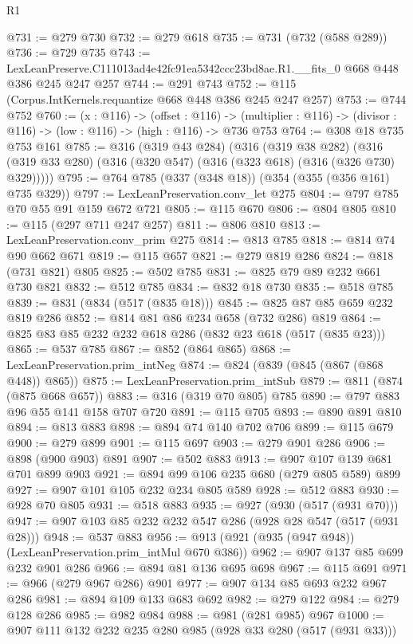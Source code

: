 \begin{lexlean}{R1}
\begin{coremodule}
@731 := @279 @730
@732 := @279 @618
@735 := @731 (@732 (@588 @289))
@736 := @729 @735
@743 := LexLeanPreserve.C111013ad4e42fc91ea5342ccc23bd8ae.R1.__fits_0 @668 @448 @386 @245 @247 @257
@744 := @291 @743
@752 := @115 (Corpus.IntKernels.requantize @668 @448 @386 @245 @247 @257)
@753 := @744 @752
@760 := (x : @116) ->
  (offset : @116) ->
  (multiplier : @116) -> (divisor : @116) -> (low : @116) -> (high : @116) -> @736 @753
@764 := @308 @18 @735 @753 @161
@785 := @316
    (@319 @43 @284)
    (@316
      (@319 @38 @282)
      (@316 (@319 @33 @280) (@316 (@320 @547) (@316 (@323 @618) (@316 (@326 @730) @329)))))
@795 := @764 @785 (@337 (@348 @18)) (@354 (@355 (@356 @161) @735 @329))
@797 := LexLeanPreservation.conv_let @275
@804 := @797 @785 @70 @55 @91 @159 @672 @721
@805 := @115 @670
@806 := @804 @805
@810 := @115 (@297 @711 @247 @257)
@811 := @806 @810
@813 := LexLeanPreservation.conv_prim @275
@814 := @813 @785
@818 := @814 @74 @90 @662 @671
@819 := @115 @657
@821 := @279 @819 @286
@824 := @818 (@731 @821) @805
@825 := @502 @785
@831 := @825 @79 @89 @232 @661 @730 @821
@832 := @512 @785
@834 := @832 @18 @730
@835 := @518 @785
@839 := @831 (@834 (@517 (@835 @18)))
@845 := @825 @87 @85 @659 @232 @819 @286
@852 := @814 @81 @86 @234 @658 (@732 @286) @819
@864 := @825 @83 @85 @232 @232 @618 @286 (@832 @23 @618 (@517 (@835 @23)))
@865 := @537 @785
@867 := @852 (@864 @865)
@868 := LexLeanPreservation.prim_intNeg
@874 := @824 (@839 (@845 (@867 (@868 @448)) @865))
@875 := LexLeanPreservation.prim_intSub
@879 := @811 (@874 (@875 @668 @657))
@883 := @316 (@319 @70 @805) @785
@890 := @797 @883 @96 @55 @141 @158 @707 @720
@891 := @115 @705
@893 := @890 @891 @810
@894 := @813 @883
@898 := @894 @74 @140 @702 @706
@899 := @115 @679
@900 := @279 @899
@901 := @115 @697
@903 := @279 @901 @286
@906 := @898 (@900 @903) @891
@907 := @502 @883
@913 := @907 @107 @139 @681 @701 @899 @903
@921 := @894 @99 @106 @235 @680 (@279 @805 @589) @899
@927 := @907 @101 @105 @232 @234 @805 @589
@928 := @512 @883
@930 := @928 @70 @805
@931 := @518 @883
@935 := @927 (@930 (@517 (@931 @70)))
@947 := @907 @103 @85 @232 @232 @547 @286 (@928 @28 @547 (@517 (@931 @28)))
@948 := @537 @883
@956 := @913 (@921 (@935 (@947 @948)) (LexLeanPreservation.prim_intMul @670 @386))
@962 := @907 @137 @85 @699 @232 @901 @286
@966 := @894 @81 @136 @695 @698
@967 := @115 @691
@971 := @966 (@279 @967 @286) @901
@977 := @907 @134 @85 @693 @232 @967 @286
@981 := @894 @109 @133 @683 @692
@982 := @279 @122
@984 := @279 @128 @286
@985 := @982 @984
@988 := @981 (@281 @985) @967
@1000 := @907 @111 @132 @232 @235 @280 @985 (@928 @33 @280 (@517 (@931 @33)))

\end{coremodule}
\end{lexlean}
